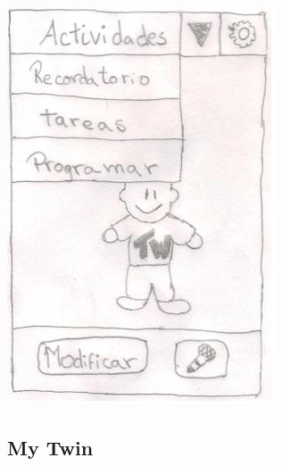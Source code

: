 \documentclass[10pt]{article}
\begin{document}
{\begin{flushleft}
\begin{center}
\includegraphics[scale=0.6]{Twin3}
\end{center}


\end{flushleft}


\newpage
\begin{flushleft}
\section{My Twin}

\end{flushleft}}
\end{document}
